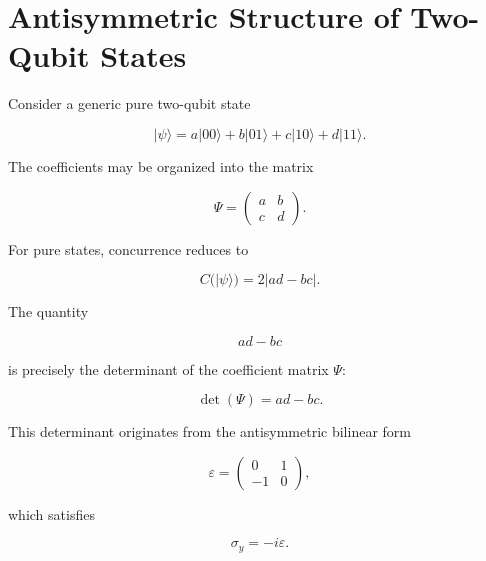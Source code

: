 
\section*{Antisymmetric Structure of Two-Qubit States}

Consider a generic pure two-qubit state

\begin{equation}
|\psi\rangle
=
a|00\rangle
+
b|01\rangle
+
c|10\rangle
+
d|11\rangle.
\label{eq:generic_two_qubit_state_appendix}
\end{equation}

The coefficients may be organized into the matrix

\begin{equation}
\Psi
=
\begin{pmatrix}
a & b \\
c & d
\end{pmatrix}.
\label{eq:coefficient_matrix_appendix}
\end{equation}

For pure states, concurrence reduces to

\begin{equation}
C(|\psi\rangle)
=
2|ad-bc|.
\label{eq:pure_state_concurrence_appendix}
\end{equation}

The quantity

\[
ad-bc
\]

is precisely the determinant of the coefficient matrix \( \Psi \):

\begin{equation}
\det(\Psi)
=
ad-bc.
\label{eq:determinant_coefficient_matrix}
\end{equation}

This determinant originates from the antisymmetric bilinear form

\begin{equation}
\varepsilon
=
\begin{pmatrix}
0 & 1 \\
-1 & 0
\end{pmatrix},
\label{eq:antisymmetric_tensor_appendix}
\end{equation}

which satisfies

\begin{equation}
\sigma_y
=
-i\varepsilon.
\label{eq:sigma_y_epsilon_relation}
\end{equation}

